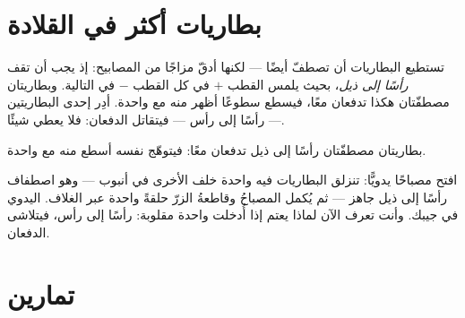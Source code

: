\section{بطاريات أكثر في القلادة}

\begin{example}\label{ex:g4:series-circuits:batteries}
تستطيع البطاريات أن تصطفّ  أيضًا --- لكنها أدقّ مزاجًا
من المصابيح: إذ يجب أن تقف \emph{رأسًا إلى ذيل}، بحيث يلمس القطب
$+$ في كل  القطب $-$ في التالية. وبطاريتان مصطفّتان هكذا
تدفعان معًا، فيسطع  سطوعًا أظهر منه مع واحدة. أدِر إحدى
البطاريتين --- رأسًا إلى رأس --- فيتقاتل الدفعان: فلا يعطي
 شيئًا.
\end{example}

\begin{omfigure}

{\small بطاريتان مصطفّتان رأسًا إلى ذيل تدفعان معًا: فيتوهّج
 نفسه أسطع منه مع  واحدة.}
\end{omfigure}

\begin{example}\label{ex:g4:series-circuits:flashlight}
افتح مصباحًا يدويًّا: تنزلق البطاريات فيه واحدة خلف الأخرى في
أنبوب --- وهو اصطفاف رأسًا إلى ذيل جاهز --- ثم يُكمل المصباحُ
وقاطعةُ الزرّ حلقةً واحدة عبر الغلاف.  اليدوي  في جيبك. وأنت تعرف الآن لماذا يعتم إذا أُدخلت 
واحدة مقلوبة: رأسًا إلى رأس، فيتلاشى الدفعان.
\end{example}

\section{تمارين}

